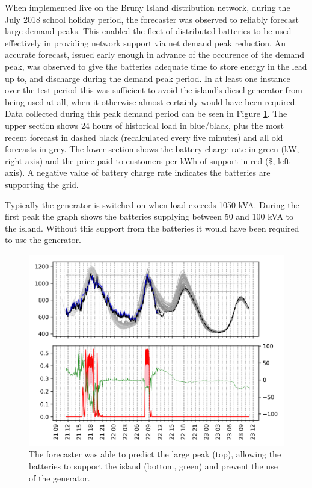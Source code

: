 \documentclass[conference]{IEEEtran}
\begin{document}
When implemented live on the Bruny Island distribution network, during the July 2018 school holiday period, the forecaster was observed to reliably forecast large demand peaks.
This enabled the fleet of distributed batteries to be used effectively in providing network support via net demand peak reduction. An accurate forecast, issued early enough in advance of the occurence of the demand peak, was observed to give the batteries adequate time to store energy in the lead up to, and discharge during the demand peak period. In at least one instance over the test period this was sufficient to avoid the island's diesel generator from being used at all, when it otherwise almost certainly would have been required.
Data collected during this peak demand period can be seen in Figure \ref{fig:bruny_nac}.
The upper section shows 24 hours of historical load in blue/black, plus the most recent forecast in dashed black (recalculated every five minutes) and all old forecasts in grey.
The lower section shows the battery charge rate in green (kW, right axis) and the price paid to customers per kWh of support in red (\$, left axis).
A negative value of battery charge rate indicates the batteries are supporting the grid.

Typically the generator is switched on when load exceeds 1050 kVA.
During the first peak the graph shows the batteries supplying between 50 and 100 kVA to the island.
Without this support from the batteries it would have been required to use the generator.

\begin{figure}[htbp]
	\centerline{\includegraphics[width=.35\textwidth]{images/bruny_nac.png}}
	\caption{The forecaster was able to predict the large peak (top), allowing the batteries to support the island (bottom, green) and prevent the use of the generator.}
	\label{fig:bruny_nac}
\end{figure}
\end{document}
